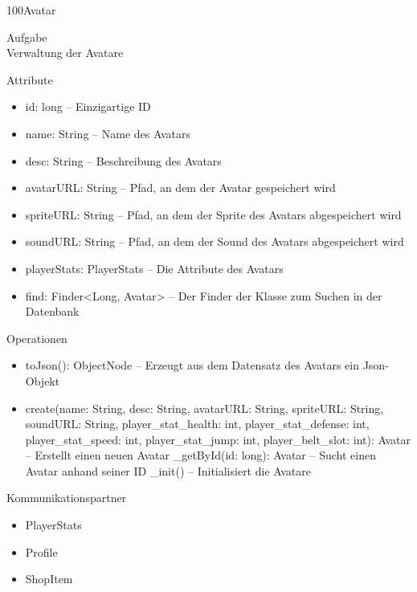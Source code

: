 \newpage
\begin{class}{100}{Avatar}
\item[Aufgabe]~\\
Verwaltung der Avatare
\item[Attribute]~\\
\begin{itemize}
\item id: long -- Einzigartige ID
\item name: String -- Name des Avatars
\item desc: String -- Beschreibung des Avatars
\item avatarURL: String -- Pfad, an dem der Avatar gespeichert wird
\item spriteURL: String -- Pfad, an dem der Sprite des Avatars abgespeichert wird
\item soundURL: String -- Pfad, an dem der Sound des Avatars abgespeichert wird
\item playerStats: PlayerStats -- Die Attribute des Avatars
\item find: Finder<Long, Avatar> -- Der Finder der Klasse zum Suchen in der Datenbank
\end{itemize}
\item[Operationen]~\\
\begin{itemize}
\item toJson(): ObjectNode -- Erzeugt aus dem Datensatz des Avatars ein Json-Objekt
\item create(name: String, desc: String, avatarURL: String, spriteURL: String, soundURL: String, player\_stat\_health: int, player\_stat\_defense: int, player\_stat\_speed: int, player\_stat\_jump: int, player\_belt\_slot: int): Avatar -- Erstellt einen neuen Avatar
\_getById(id: long): Avatar -- Sucht einen Avatar anhand seiner ID
\_init() -- Initialisiert die Avatare
\end{itemize}
\item[Kommunikationspartner]~\\
\begin{itemize}
\item PlayerStats
\item Profile
\item ShopItem
\end{itemize}
\end{class}

